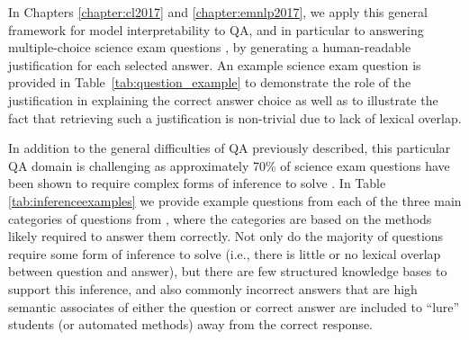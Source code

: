 In Chapters \ref{chapter:cl2017} and \ref{chapter:emnlp2017}, we apply this general framework for model interpretability to QA, and in particular to answering multiple-choice science exam questions \citep{clark:2015}, by generating a human-readable justification for each selected answer.  An example science exam question is provided in Table~\ref{tab:question_example} to demonstrate the role of the justification in explaining the correct answer choice as well as to illustrate the fact that retrieving such a justification is non-trivial due to lack of lexical overlap. 

In addition to the general difficulties of QA previously described, this particular QA domain is challenging as approximately 70\% of science exam questions have been shown to require complex forms of inference to solve \citep{clark:2013,jansen-EtAl:2016:COLING} .  In Table \ref{tab:inferenceexamples} we provide example questions from each of the three main categories of questions from \citet{clark:2013}, where the categories are based on the methods likely required to answer them correctly.  Not only do the majority of questions require some form of inference to solve (i.e., there is little or no lexical overlap between question and answer), but there are few structured knowledge bases to support this inference, and also commonly incorrect answers that are high semantic associates of either the question or correct answer are included to ``lure'' students (or automated methods) away from the correct response.


